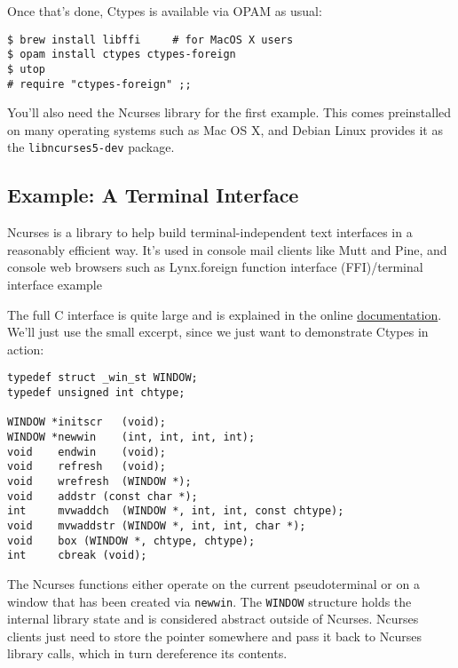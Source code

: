 Once that's done, Ctypes is available via OPAM as usual:

\begin{lstlisting}
$ brew install libffi     # for MacOS X users
$ opam install ctypes ctypes-foreign
$ utop
# require "ctypes-foreign" ;;
\end{lstlisting}

You'll also need the Ncurses library for the first example. This comes
preinstalled on many operating systems such as Mac OS X, and Debian
Linux provides it as the \passthrough{\lstinline!libncurses5-dev!}
package.

\hypertarget{example-a-terminal-interface}{%
\subsection{Example: A Terminal
Interface}\label{example-a-terminal-interface}}

Ncurses is a library to help build terminal-independent text interfaces
in a reasonably efficient way. It's used in console mail clients like
Mutt and Pine, and console web browsers such as
Lynx.\protect\hypertarget{FFItermint}{}{foreign function interface
(FFI)/terminal interface example}

The full C interface is quite large and is explained in the online
\href{http://www.gnu.org/software/ncurses/}{documentation}. We'll just
use the small excerpt, since we just want to demonstrate Ctypes in
action:

\begin{lstlisting}
typedef struct _win_st WINDOW;
typedef unsigned int chtype;

WINDOW *initscr   (void);
WINDOW *newwin    (int, int, int, int);
void    endwin    (void);
void    refresh   (void);
void    wrefresh  (WINDOW *);
void    addstr (const char *);
int     mvwaddch  (WINDOW *, int, int, const chtype);
void    mvwaddstr (WINDOW *, int, int, char *);
void    box (WINDOW *, chtype, chtype);
int     cbreak (void);
\end{lstlisting}

The Ncurses functions either operate on the current pseudoterminal or on
a window that has been created via \passthrough{\lstinline!newwin!}. The
\passthrough{\lstinline!WINDOW!} structure holds the internal library
state and is considered abstract outside of Ncurses. Ncurses clients
just need to store the pointer somewhere and pass it back to Ncurses
library calls, which in turn dereference its contents.

